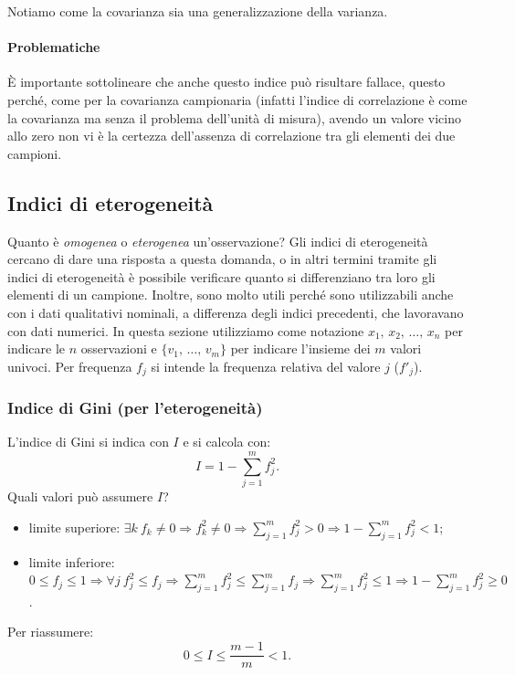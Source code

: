 \noindent Notiamo come la covarianza sia una generalizzazione della varianza.

\paragraph{Problematiche} È importante sottolineare che anche questo indice può risultare fallace, questo perché, come per la covarianza campionaria (infatti l'indice di correlazione è come la covarianza ma senza il problema dell'unità di misura), avendo un valore vicino allo zero non vi è la certezza dell'assenza di correlazione tra gli elementi dei due campioni. 

\subsection{Indici di eterogeneità}
Quanto è \textit{omogenea} o \textit{eterogenea} un'osservazione? Gli indici di eterogeneità cercano di dare una risposta a questa domanda, o in altri termini tramite gli indici di eterogeneità è possibile verificare quanto si differenziano tra loro gli elementi di un campione.
Inoltre, sono molto utili perché sono utilizzabili anche con i dati qualitativi nominali, a differenza degli indici precedenti, che lavoravano con dati numerici. In questa sezione utilizziamo come notazione $x_1, \, x_2, \, \dots, \, x_n$ per indicare le $n$ osservazioni e $\{ v_1, \, \dots, \, v_m \}$ per indicare l'insieme dei $m$ valori univoci. Per frequenza $f_j$ si intende la frequenza relativa del valore $j$ ($f'_j$).

\subsubsection{Indice di Gini (per l'eterogeneità)}
L'indice di Gini si indica con $I$ e si calcola con:
\[
\boxed{
    I = 1 - \sum_{j=1}^{m} f^2_j
}.
\]
Quali valori può assumere $I$?
\begin{itemize}
    \item limite superiore: $\exists k \: f_k \neq 0 \Rightarrow f^2_k \neq 0 \Rightarrow \sum_{j=1}^m f^2_j > 0 \Rightarrow 1 - \sum_{j=1}^m f^2_j < 1$;
    \item limite inferiore: $0 \leq f_j \leq 1 \Rightarrow \forall j \: f^2_j \leq f_j \Rightarrow \sum_{j=1}^m f^2_j \leq \sum_{j=1}^m f_j \Rightarrow \sum_{j=1}^m f^2_j \leq 1 \Rightarrow 1 - \sum_{j=1}^m f^2_j \geq 0 $.
\end{itemize}
Per riassumere: \[
\boxed{0 \leq I \leq \dfrac{m-1}{m} < 1}.
\]

